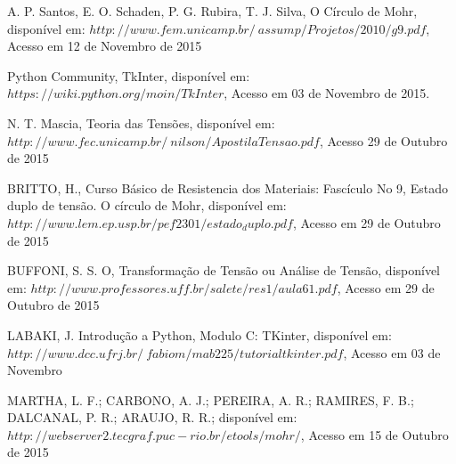 \documentclass[a4paper]{article}
\begin{document}
A. P. Santos, E. O. Schaden, P. G. Rubira, T. J. Silva, O Círculo de Mohr, disponível em: $http://www.fem.unicamp.br/~assump/Projetos/2010/g9.pdf$, Acesso em 12 de Novembro de 2015

Python Community, TkInter, disponível em: $https://wiki.python.org/moin/TkInter$, Acesso em 03 de Novembro de 2015.

N. T. Mascia, Teoria das Tensões, disponível em: $http://www.fec.unicamp.br/~nilson/ApostilaTensao.pdf$, Acesso 29 de Outubro de 2015

BRITTO, H., Curso Básico de Resistencia dos Materiais: Fascículo No 9, Estado duplo de tensão. O círculo de Mohr, disponível em: $http://www.lem.ep.usp.br/pef2301/estado_duplo.pdf$, Acesso em 29 de Outubro de 2015

BUFFONI, S. S. O, Transformação de Tensão ou Análise de Tensão, disponível em: $http://www.professores.uff.br/salete/res1/aula61.pdf$, Acesso em 29 de Outubro de 2015

LABAKI, J. Introdução a Python, Modulo C: TKinter, disponível em: $http://www.dcc.ufrj.br/~fabiom/mab225/tutorialtkinter.pdf$, Acesso em 03 de Novembro

MARTHA, L. F.; CARBONO, A. J.; PEREIRA, A. R.; RAMIRES, F. B.; DALCANAL, P. R.; ARAUJO, R. R.; disponível em: $http://webserver2.tecgraf.puc-rio.br/etools/mohr/$, Acesso em 15 de Outubro de 2015
\end{document}

